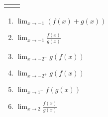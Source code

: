 \documentclass{article}
\newcommand{\fgraff}{
    \begin{minipage}[l][.30\textwidth]{3 in}{
    \begin{tikzpicture}
    \begin{axis}[
       	xmin=-3.25, xmax=3.25,
    	ymin=-2.25, ymax=2.25,
    	major tick length={0},
    	xtick={-3,-2,...,3}, ytick={-2,-1,...,2},
    	line width=1pt, title={\textbf{Graph of $f$}},
     	axis lines=center, height=2 in, width=3 in, grid=major,
     	restrict y to domain=-2.25:2.25
    	]
    	\addplot [mark=*, black, smooth, very thick] plot coordinates {(-3,2)(-2,1)};
    	\addplot [mark=*, black, smooth, very thick] plot coordinates {(-2,3)};
    	\addplot [mark=*, black, smooth, very thick] plot coordinates {(-2,0)(-1,1)};
    	\addplot [mark=*, black, smooth, very thick] plot coordinates {(-1,2)(1,2)};
    	\addplot [mark=*, black, smooth, very thick] plot coordinates {(2,-1)(3,-1)};
        \addplot [black, smooth, very thick, samples=100, domain=1:2] {(x-1)^2};
        \addplot [black, only marks, very thick, mark=*, mark options={scale=1, fill=white}]
        coordinates{(1,0) (2,1) (-1,2) (-2,1) (-2,0)};
        \addplot [black, only marks, very thick, mark=*] coordinates{(-2,2)};
    \end{axis}
    \end{tikzpicture}
    }
    \end{minipage}}
\newcommand{\ggraff}{
    \begin{minipage}[l][.30\textwidth]{3 in}{
    \begin{tikzpicture}
    \begin{axis}[
       	xmin=-3.25, xmax=3.25,
    	ymin=-2.25, ymax=2.25,
    	major tick length={0},
    	xtick={-3,-2,...,3}, ytick={-2,-1,...,2},
    	line width=1pt, title={\textbf{Graph of $g$}},
     	axis lines=center, height=2 in, width=3 in, grid=major,
     	restrict y to domain=-2.25:2.25
    	]
    	\addplot [mark=*, black, smooth, very thick] plot coordinates {(-3,-1)(-1,-1)};
    	\addplot [mark=*, black, smooth, very thick] plot coordinates {(1,-1)(3,1)};
    	\addplot [black, very thick, mark=*, mark options={scale=1, fill=white}] plot coordinates {(-1,-2)(1,-2)};
    \end{axis}
    \end{tikzpicture}
    }
    \end{minipage}}
\begin{document}
\begin{itemize}
\begin{enumerate}
                        \begin{center}
                        \begin{tabular}{l r}
                        \fgraff & \ggraff
                        \end{tabular}
                        \end{center}
                        \begin{enumerate}
                        \item $\displaystyle \lim_{x\rightarrow -1} (f(x)+g(x))$
                        \item $\displaystyle \lim_{x\rightarrow -1} \frac{f(x)}{g(x)}$
                        \item $\displaystyle \lim_{x \rightarrow -2^-} g(f(x))$
                        \item $\displaystyle \lim_{x \rightarrow -2^+} g(f(x))$
                        \item $\displaystyle \lim_{x\rightarrow 1^-} f(g(x))$
                        \item $\displaystyle \lim_{x\rightarrow 2} \frac{f(x)}{g(x)}$
                        \end{enumerate}
    
    
                    \end{enumerate}
            \end{itemize}
    
    
    
\end{document}
